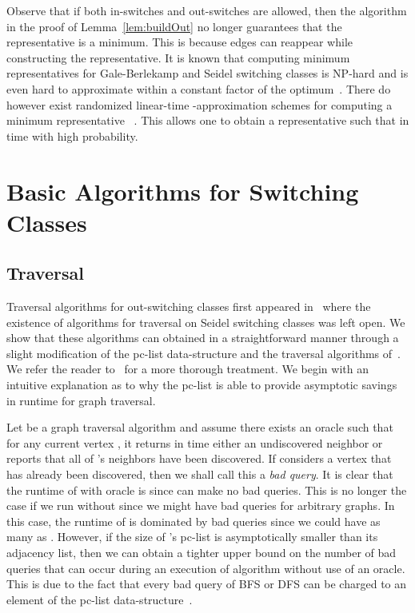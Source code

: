 \documentclass{llncs}
\begin{document}
\noindent Observe that if both in-switches and out-switches are allowed, then the algorithm in the proof of Lemma~\ref{lem:buildOut} no longer guarantees that the representative is a minimum.  This is because edges can reappear while constructing the representative.  It is known that computing minimum representatives for Gale-Berlekamp and Seidel switching classes is NP-hard and is even hard to approximate within a constant factor of the optimum~\cite{RothV08,JelinkovaSHK11}.  There do however exist randomized linear-time -approximation schemes for computing a minimum representative ~\cite{KarpinskiS09}.  This allows one to obtain a representative  such that  in  time with high probability.



\section{Basic Algorithms for Switching Classes}

\subsection{Traversal}

Traversal algorithms for out-switching classes first appeared in~\cite{DahlhausGM02} where the existence of  algorithms for traversal on Seidel switching classes was left open.  We show that these algorithms can obtained in a straightforward manner through a slight modification of the pc-list data-structure and the traversal algorithms of~\cite{DahlhausGM02,LindzeyO13}.
 We refer the reader to~\cite{DahlhausGM02,LindzeyO13} for a more thorough treatment.  We begin with an intuitive explanation as to why the pc-list is able to provide asymptotic savings in runtime for graph traversal.

Let  be a graph traversal algorithm and assume there exists an oracle  such that for any current vertex , it returns in  time either an undiscovered neighbor  or reports that all of 's neighbors have been discovered.  If  considers a vertex that has already been discovered, then we shall call this a \emph{bad query}. It is clear that the runtime of  with oracle  is  since  can make no bad queries.  This is no longer the case if we run  without  since we might have  bad queries for arbitrary graphs. In this case, the runtime of  is dominated by bad queries since we could have as many as .  However, if the size of 's pc-list is asymptotically smaller than its adjacency list, then we can obtain a tighter upper bound on the number of bad queries that can occur during an execution of algorithm  without use of an oracle.  This is due to the fact that every bad query of BFS or DFS can be charged to an element of the pc-list data-structure~\cite{DahlhausGM02,LindzeyO13}.
\end{document}
